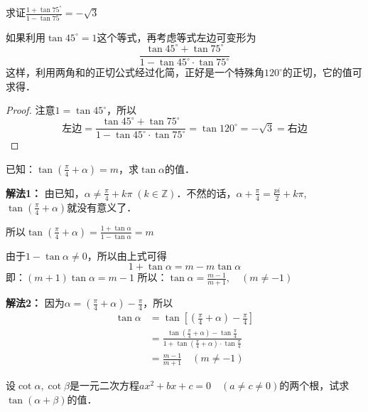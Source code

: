 \begin{example}
求证$\frac{1+\tan 75^{\circ}}{1-\tan 75^{\circ}}=-\sqrt{3}$
\end{example}

\begin{analyze}
如果利用$\tan45^{\circ}=1$这个等式，再考虑等式左边可变形为
\[\frac{\tan 45^{\circ}+\tan 75^{\circ}}{1-\tan 45^{\circ}\cdot \tan 75^{\circ}}\]
这样，利用两角和的正切公式经过化简，正好是一个特殊角$120^{\circ}$的正切，它的值可求得．
\end{analyze}

\begin{proof}
注意$1=\tan 45^{\circ}$，所以
\[\text{左边}=\frac{\tan 45^{\circ}+\tan 75^{\circ}}{1-\tan 45^{\circ}\cdot \tan 75^{\circ}}=\tan 120^{\circ}=-\sqrt{3}=\text{右边}\]
\end{proof}


\begin{example}
    已知：$\tan\left(\frac{\pi}{4}+\alpha\right)=m$，求$\tan\alpha$的值．
\end{example}

\begin{solution}
\textbf{解法1：} 由已知，$\alpha\ne \frac{\pi}{4}+k\pi\; (k\in\mathbb{Z})$．不然的话，$\alpha+\frac{\pi}{4}=\frac{pi}{2}+k\pi$, $\tan\left(\frac{\pi}{4}+\alpha\right)$就没有意义了．

所以$\tan\left(\frac{\pi}{4}+\alpha\right)=\frac{1+\tan\alpha}{1-\tan\alpha}=m$

由于$1-\tan\alpha\ne 0$，所以由上式可得
\[1+\tan\alpha=m-m\tan\alpha\]
即：$(m+1)\tan\alpha=m-1$
所以：$\tan\alpha=\frac{m-1}{m+1},\quad (m\ne -1)$

\textbf{解法2：} 因为$\alpha=\left(\frac{\pi}{4}+\alpha\right)-\frac{\pi}{4}$，所以
\[\begin{split}
   \tan \alpha&=\tan\left[\left(\frac{\pi}{4}+\alpha\right)-\frac{\pi}{4}\right] \\
   &=\frac{\tan\left(\frac{\pi}{4}+\alpha\right)-\tan\frac{\pi}{4}}{1+\tan\left(\frac{\pi}{4}+\alpha\right)\cdot \tan\frac{\pi}{4}}\\
   &=\frac{m-1}{m+1}\quad (m\ne -1)
\end{split}\]
\end{solution}



\begin{example}
设$\cot\alpha, \cot\beta$是一元二次方程$ax^2+bx+c=0\quad (a\ne c\ne 0)$的两个根，试求$\tan (\alpha+\beta)$的值．
\end{example}


